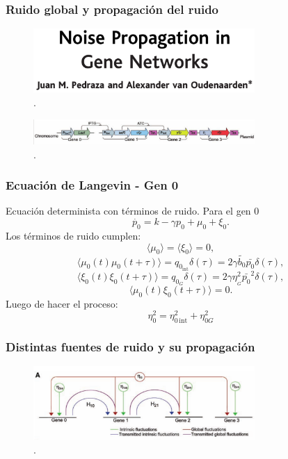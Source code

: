\documentclass{beamer}
\begin{document}

\begin{frame}
  \frametitle{Ruido global y propagaci\'on del ruido}
\begin{figure}[p]
    \centering
    \includegraphics[width=0.75\textwidth]{pedraza05.png}\\
    \tiny \cite{pedraza05}.
\end{figure}
\begin{figure}[p]
    \centering
    \includegraphics[width=0.75\textwidth]{circuitex.png}\\
    \tiny \cite{pedraza05}.
\end{figure}
\end{frame}

\begin{frame}
  \frametitle{Ecuaci\'on de Langevin - Gen 0}
Ecuaci\'on determinista con t\'erminos de ruido. Para el gen 0
$$\dot{p_0} = k - \gamma p_0 + \mu_0 + \xi_{0}.$$
Los t\'erminos de ruido cumplen:
$$\langle \mu_0 \rangle = \langle \xi_0 \rangle = 0,$$
$$\langle \mu_0(t)\mu_0(t+\tau) \rangle = q_{0_{\text{int}}} \delta(\tau) = 2\gamma \tilde{b_0} \bar{p_0} \delta(\tau),$$
$$\langle \xi_0(t)\xi_0(t+\tau) \rangle = q_{0_G} \delta(\tau) = 2 \gamma \eta_{_G}^2\bar{p_0}^2 \delta(\tau),$$
$$\langle \mu_0(t)\xi_0(t+\tau) \rangle = 0.$$
Luego de hacer el proceso:
$$\eta_0^2=\eta_{0\,\text{int}}^2+\eta_{0G}^2$$
\end{frame}

\begin{frame}
\frametitle{Distintas fuentes de ruido y su propagaci\'on}
\begin{figure}[p]
    \centering
    \includegraphics[width=0.75\textwidth]{globalint.png}\\
    \tiny \cite{pedraza05}.
\end{figure}

\end{frame}
\end{document}
